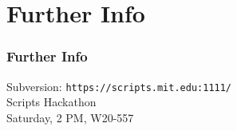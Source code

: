 \section{Further Info}
\begin{frame}
  \frametitle{Further Info}
  Subversion: {\tt https://scripts.mit.edu:1111/}
  \\
  Scripts Hackathon \\ Saturday, 2 PM, W20-557
\end{frame}
